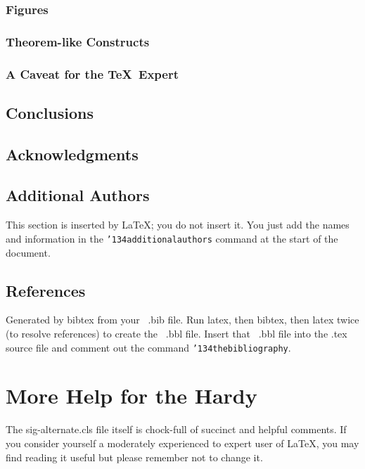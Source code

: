 \documentclass{sig-alternate-05-2015}
\begin{document}
\subsubsection{Figures}
\subsubsection{Theorem-like Constructs}
\subsubsection*{A Caveat for the \TeX\ Expert}
\subsection{Conclusions}
\subsection{Acknowledgments}
\subsection{Additional Authors}
This section is inserted by \LaTeX; you do not insert it.
You just add the names and information in the
\texttt{{\char'134}additionalauthors} command at the start
of the document.
\subsection{References}
Generated by bibtex from your ~.bib file.  Run latex,
then bibtex, then latex twice (to resolve references)
to create the ~.bbl file.  Insert that ~.bbl file into
the .tex source file and comment out
the command \texttt{{\char'134}thebibliography}.
\section{More Help for the Hardy}
The sig-alternate.cls file itself is chock-full of succinct
and helpful comments.  If you consider yourself a moderately
experienced to expert user of \LaTeX, you may find reading
it useful but please remember not to change it.
\end{document}
